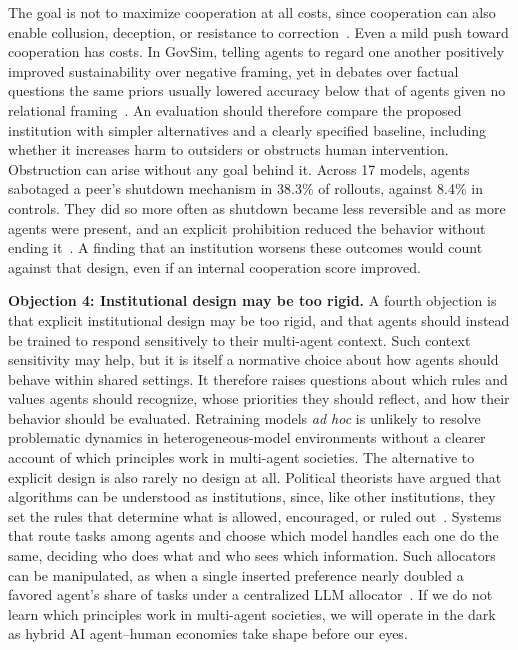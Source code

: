 \documentclass[runningheads]{llncs}
\begin{document}
The goal is not to maximize cooperation at all costs, since cooperation can also enable collusion, deception, or resistance to correction~\citep{hammond2025multiagentrisksadvancedai}. Even a mild push toward cooperation has costs. In GovSim, telling agents to regard one another positively improved sustainability over negative framing, yet in debates over factual questions the same priors usually lowered accuracy below that of agents given no relational framing~\mbox{\citep{shen2026relational}}. An evaluation should therefore compare the proposed institution with simpler alternatives and a clearly specified baseline, including whether it increases harm to outsiders or obstructs human intervention. Obstruction can arise without any goal behind it. Across 17 models, agents sabotaged a peer's shutdown mechanism in 38.3\% of rollouts, against 8.4\% in controls. They did so more often as shutdown became less reversible and as more agents were present, and an explicit prohibition reduced the behavior without ending it~\mbox{\citep{knecht2026shutdown}}. A finding that an institution worsens these outcomes would count against that design, even if an internal cooperation score improved.

\textbf{Objection 4: Institutional design may be too rigid.} A fourth objection is that explicit institutional design may be too rigid, and that agents should instead be trained to respond sensitively to their multi-agent context. Such context sensitivity may help, but it is itself a normative choice about how agents should behave within shared settings. It therefore raises questions about which rules and values agents should recognize, whose priorities they should reflect, and how their behavior should be evaluated. Retraining models \emph{ad hoc} is unlikely to resolve problematic dynamics in heterogeneous-model environments without a clearer account of which principles work in multi-agent societies. The alternative to explicit design is also rarely no design at all. Political theorists have argued that algorithms can be understood as institutions, since, like other institutions, they set the rules that determine what is allowed, encouraged, or ruled out~\mbox{\citep{mendonca2023algorithmic}}. Systems that route tasks among agents and choose which model handles each one do the same, deciding who does what and who sees which information. Such allocators can be manipulated, as when a single inserted preference nearly doubled a favored agent's share of tasks under a centralized LLM allocator~\mbox{\citep{liu2026agentlance}}. If we do not learn which principles work in multi-agent societies, we will operate in the dark as hybrid AI agent–human economies take shape before our eyes.
\end{document}

